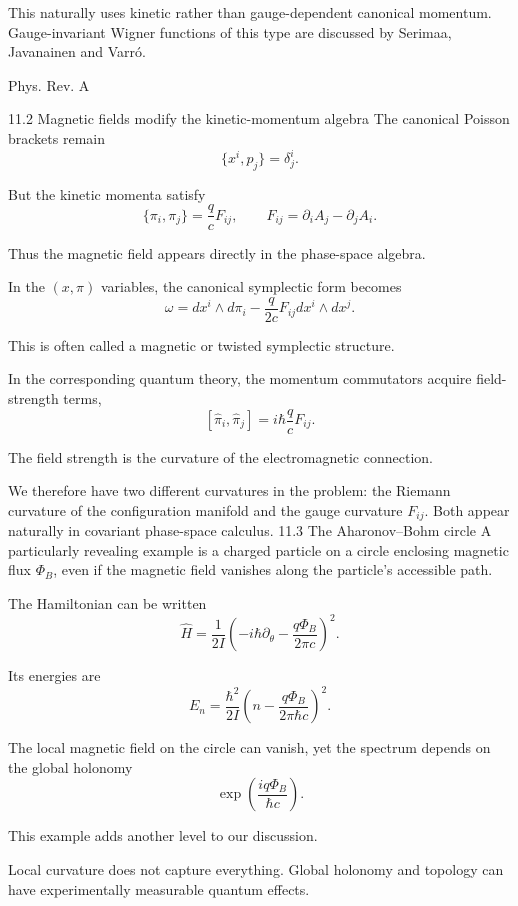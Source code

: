 This naturally uses kinetic rather than gauge-dependent canonical momentum. Gauge-invariant Wigner functions of this type are discussed by Serimaa, Javanainen and Varró. 

Phys. Rev. A



11.2 Magnetic fields modify the kinetic-momentum algebra
The canonical Poisson brackets remain
\[
\{x^i,p_j\}=\delta^i_j.
\]

But the kinetic momenta satisfy
\[
\boxed{
\{\pi_i,\pi_j\}
=
\frac qcF_{ij},
\qquad
F_{ij}=\partial_iA_j-\partial_jA_i.
}
\tag{101}
\]

Thus the magnetic field appears directly in the phase-space algebra.

In the \((x,\pi)\) variables, the canonical symplectic form becomes
\[
\omega=
dx^i\wedge d\pi_i
-
\frac{q}{2c}F_{ij}dx^i\wedge dx^j.
\tag{102}
\]

This is often called a magnetic or twisted symplectic structure.

In the corresponding quantum theory, the momentum commutators acquire field-strength terms,
\[
[\widehat\pi_i,\widehat\pi_j]
=
i\hbar\frac qcF_{ij}.
\tag{103}
\]

The field strength is the curvature of the electromagnetic connection.

We therefore have two different curvatures in the problem: the Riemann curvature of the configuration manifold and the gauge curvature \(F_{ij}\). Both appear naturally in covariant phase-space calculus.
11.3 The Aharonov–Bohm circle
A particularly revealing example is a charged particle on a circle enclosing magnetic flux \(\Phi_B\), even if the magnetic field vanishes along the particle's accessible path.

The Hamiltonian can be written
\[
\widehat H=
\frac1{2I}
\left(
-i\hbar\partial_\theta
-\frac{q\Phi_B}{2\pi c}
\right)^2.
\tag{104}
\]

Its energies are
\[
\boxed{
E_n=
\frac{\hbar^2}{2I}
\left(
n-\frac{q\Phi_B}{2\pi\hbar c}
\right)^2.
}
\tag{105}
\]

The local magnetic field on the circle can vanish, yet the spectrum depends on the global holonomy
\[
\exp\left(\frac{iq\Phi_B}{\hbar c}\right).
\tag{106}
\]

This example adds another level to our discussion.

Local curvature does not capture everything. Global holonomy and topology can have experimentally measurable quantum effects.


